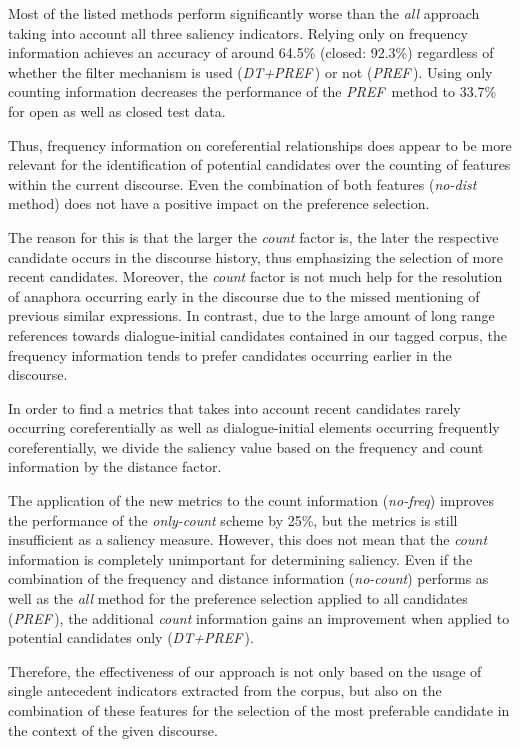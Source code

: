 Most of the listed methods perform significantly worse than the {\em all} approach taking into account
all three saliency indicators.
Relying only on frequency information achieves an accuracy of around 64.5\% (closed: 92.3\%) 
regardless of whether the filter mechanism is used ({\small\em DT+PREF}\,) or not ({\small\em PREF}\,). Using only
counting information decreases the performance of the {\small\em PREF}\, method to 33.7\% for open as well as
closed test data.

Thus, frequency information on coreferential relationships does appear to be more relevant
for the identification of potential candidates over the counting of features within the current discourse. 
Even the combination of both features ({\em no-dist} method) does not have a positive impact on
the preference selection.

The reason for this is that the larger the {\em count} factor is, the later the respective candidate occurs
in the discourse history, thus emphasizing the selection of more recent candidates. Moreover, the {\em count} factor
is not much help for the resolution of anaphora occurring early in the discourse due to the missed mentioning
of previous similar expressions.
In contrast, due to the large amount of long range references towards dialogue-initial candidates contained
in our tagged corpus, the frequency information tends to prefer candidates occurring earlier in the discourse.

In order to find a metrics that takes into account recent candidates rarely occurring coreferentially as well
as dialogue-initial elements occurring frequently coreferentially, we divide the saliency value based on
the frequency and count information by the distance factor.

The application of the new metrics to the count information ({\em no-freq}) improves the performance
of the {\em only-count} scheme by 25\%, but the metrics is still insufficient as a saliency measure. However, 
this does not mean that the {\em count} information is completely unimportant for determining
saliency. Even if the combination of the frequency and distance information ({\em no-count}) performs
as well as the {\em all} method for the preference selection applied to all candidates ({\small\em PREF}\,),
the additional {\em count} information gains an improvement when applied to potential candidates only
({\small\em DT+PREF}\,).

Therefore, the effectiveness of our approach is not only based on the usage of single
antecedent indicators extracted from the corpus, but also on the combination of these
features for the selection of the most preferable candidate in the context of the given
discourse.

